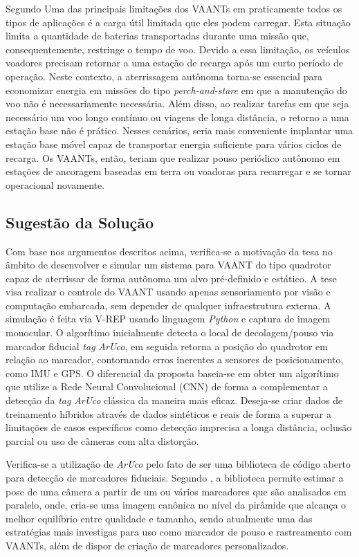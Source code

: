 Segundo \citet{Gilberto2016} Uma das principais limitações dos VAANTs em praticamente todos os tipos de aplicações é a carga útil limitada que eles podem carregar. Esta situação limita a quantidade de baterias transportadas durante uma missão que, consequentemente, restringe o tempo de voo. Devido a essa limitação, os veículos voadores precisam retornar a uma estação de recarga após um curto período de operação. Neste contexto, a aterrissagem autônoma torna-se essencial para economizar energia em missões do tipo \textit{perch-and-stare} em que a manutenção do voo não é necessariamente necessária. Além disso, ao realizar tarefas em que seja necessário um voo longo contínuo ou viagens de longa distância, o retorno a uma estação base não é prático. Nesses cenários, seria mais conveniente implantar uma estação base móvel capaz de transportar energia suficiente para vários ciclos de recarga. Os VAANTs, então, teriam que realizar pouso periódico autônomo em estações de ancoragem baseadas em terra ou voadoras para recarregar e se tornar operacional novamente.

\subsection{Sugestão da Solução}

Com base nos argumentos descritos acima, verifica-se a motivação da tesa no âmbito de desenvolver e simular um sistema para VAANT do tipo quadrotor capaz de aterrissar de forma autônoma um alvo pré-definido e estático. A tese visa realizar o controle do VAANT usando apenas sensoriamento por visão e computação embarcada, sem depender de qualquer infraestrutura externa. A simulação é feita via V-REP usando linguagem \textit{Python} e captura de imagem monocular. O algorítimo inicialmente detecta o local de decolagem/pouso via marcador fiducial \textit{tag} \textit{ArUco}, em seguida retorna a posição do quadrotor em relação ao marcador, contornando erros inerentes a sensores de posicionamento, como IMU e GPS. O diferencial da proposta baseia-se em obter um algorítimo que utilize a Rede Neural Convolucional (CNN) de forma a complementar a detecção da \textit{tag} \textit{ArUco} clássica da maneira mais eficaz. Deseja-se criar dados de treinamento híbridos através de dados sintéticos e reais de forma a superar a limitações de casos específicos como detecção imprecisa a longa distância, oclusão parcial ou uso de câmeras com alta distorção. 

Verifica-se a utilização de \textit{ArUco} pelo fato de ser uma biblioteca de código aberto para detecção de marcadores fiduciais. Segundo \citet{Aruco2014}, a biblioteca permite estimar a pose de uma câmera a partir de um ou vários marcadores que são analisados em paralelo, onde, cria-se uma imagem canônica no nível da pirâmide que alcança o melhor equilíbrio entre qualidade e tamanho, sendo atualmente uma das estratégias mais investigas para uso como marcador de pouso e rastreamento com VAANTs, além de dispor de criação de marcadores personalizados. 

